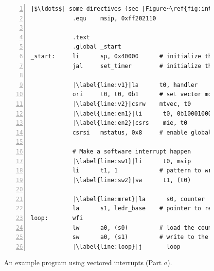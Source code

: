 \documentclass[11pt, twoside, pdftex]{article}
\begin{document}
\begin{figure}[H]
\begin{center}
\begin{minipage}[h]{15 cm}
\begin{lstlisting}[style=defaultNiosVStyle, name=vecs, numbers=left, escapechar=|]
            |$\ldots$| some directives (see |Figure~\ref{fig:ints}) not| shown
            .equ    msip, 0xff202110

            .text
            .global _start
_start:     li      sp, 0x40000      # initialize the stack location
            jal     set_timer        # initialize the timer 
     
            |\label{line:v1}|la      t0, handler      # get handler address
            ori     t0, t0, 0b1      # set vector mode
            |\label{line:v2}|csrw    mtvec, t0        # set trap address and mode
            |\label{line:en1}|li      t0, 0b10001000   # set the enable pattern
            |\label{line:en2}|csrs    mie, t0          # timer & software interrupts
            csrsi   mstatus, 0x8     # enable global interrupts

            # Make a software interrupt happen
            |\label{line:sw1}|li      t0, msip         # address of msip register
            li      t1, 1            # pattern to write to msip
            |\label{line:sw2}|sw      t1, (t0)         # set software interrupt

            |\label{line:mret}|la      s0, counter      # pointer to counter
            la      s1, ledr_base    # pointer to red lights
loop:       wfi
            lw      a0, (s0)         # load the counter value
            sw      a0, (s1)         # write to the lights
            |\label{line:loop}|j       loop
\end{lstlisting}
	\caption{An example program using vectored interrupts (Part $a$).}
	\label{fig:vectored}
\end{minipage}
\end{center}
\end{figure}
\end{document}
